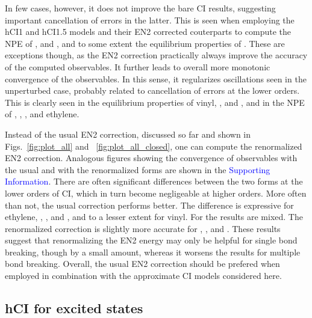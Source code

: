 \documentclass[aip,jcp,reprint,noshowkeys,superscriptaddress]{revtex4-1}
\newcommand{\SupInf}{\textcolor{blue}{Supporting Information}}
\begin{document}
In few cases, however, it does not improve the bare CI results, suggesting important cancellation of errors in the latter.
This is seen when employing the hCI1 and hCI1.5 models and their EN2 corrected couterparts to compute the NPE of ,  and , and to some extent the equilibrium properties of .
These are exceptions though, as the EN2 correction practically always improve the accuracy of the computed observables.
It further leads to overall more monotonic convergence of the observables.
In this sense, it regularizes oscillations seen in the unperturbed case, probably related to cancellation of errors at the lower orders.
This is clearly seen in the equilibrium properties of vinyl, , and ,
and in the NPE of , , , and ethylene.

Instead of the usual EN2 correction, discussed so far and shown in Figs.~\ref{fig:plot_all} and ~\ref{fig:plot_all_closed}, 
one can compute the renormalized EN2 correction. \cite{Garniron_2019}
Analogous figures showing the convergence of observables with the usual and with the renormalized forms are shown in the {\SupInf}.
There are often significant differences between the two forms at the lower orders of CI, which in turn become negligeable at higher orders.
More often than not, the usual correction performs better.
The difference is expressive for ethylene, , , and , and to a lesser extent for vinyl.
For  the results are mixed.
The renormalized correction is slightly more accurate for , , and .
These results suggest that renormalizing the EN2 energy may only be helpful for single bond breaking, though by a small amount,
whereas it worsens the results for multiple bond breaking.
Overall, the usual EN2 correction should be prefered when employed in combination with the approximate CI models considered here.



\subsection{hCI for excited states}
\label{sec:res_B}

\end{document}
